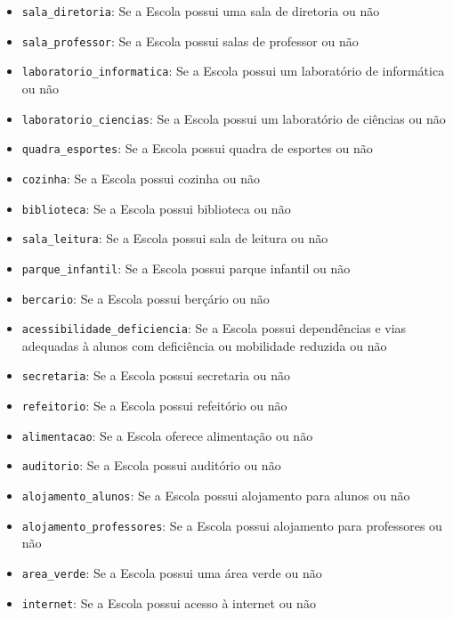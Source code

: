 \documentclass[12pt,a4paper]{article}
\begin{document}
\begin{itemize}

    \item \texttt{sala\_diretoria}: Se a Escola possui uma sala de diretoria ou não

    \item \texttt{sala\_professor}: Se a Escola possui salas de professor ou não

    \item \texttt{laboratorio\_informatica}: Se a Escola possui um laboratório de informática ou não

    \item \texttt{laboratorio\_ciencias}: Se a Escola possui um laboratório de ciências ou não

    \item \texttt{quadra\_esportes}: Se a Escola possui quadra de esportes ou não

    \item \texttt{cozinha}: Se a Escola possui cozinha ou não

    \item \texttt{biblioteca}: Se a Escola possui biblioteca ou não

    \item \texttt{sala\_leitura}: Se a Escola possui sala de leitura ou não

    \item \texttt{parque\_infantil}: Se a Escola possui parque infantil ou não

    \item \texttt{bercario}: Se a Escola possui berçário ou não

    \item \texttt{acessibilidade\_deficiencia}: Se a Escola possui dependências e vias adequadas à alunos com deficiência ou mobilidade reduzida ou não
    
    \item \texttt{secretaria}: Se a Escola possui secretaria ou não

    \item \texttt{refeitorio}: Se a Escola possui refeitório ou não

    \item \texttt{alimentacao}: Se a Escola oferece alimentação ou não

    \item \texttt{auditorio}: Se a Escola possui auditório ou não

    \item \texttt{alojamento\_alunos}: Se a Escola possui alojamento para alunos ou não

    \item \texttt{alojamento\_professores}: Se a Escola possui alojamento para professores ou não

    \item \texttt{area\_verde}: Se a Escola possui uma área verde ou não

    \item \texttt{internet}: Se a Escola possui acesso à internet ou não

\end{itemize}
\end{document}
